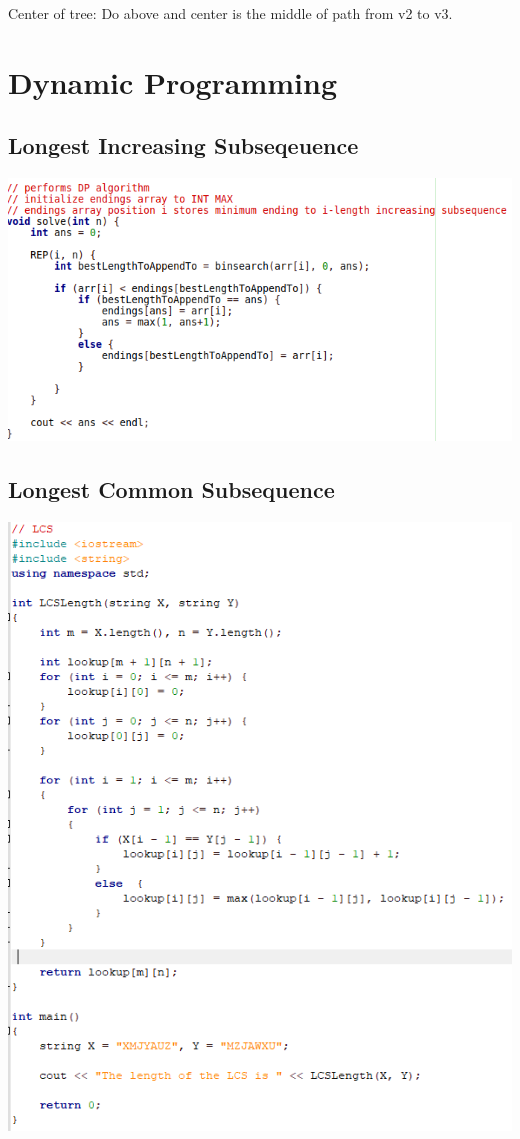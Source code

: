 \documentclass[11pt,twocolumn]{article}
\begin{document}
Center of tree: Do above and center is the middle of path from v2 to v3.

\section{Dynamic Programming}
\subsection{Longest Increasing Subseqeuence}

\includegraphics[scale=0.5]{lis}

\subsection{Longest Common Subsequence}

\includegraphics[scale=0.5]{lcs}
\end{document}
